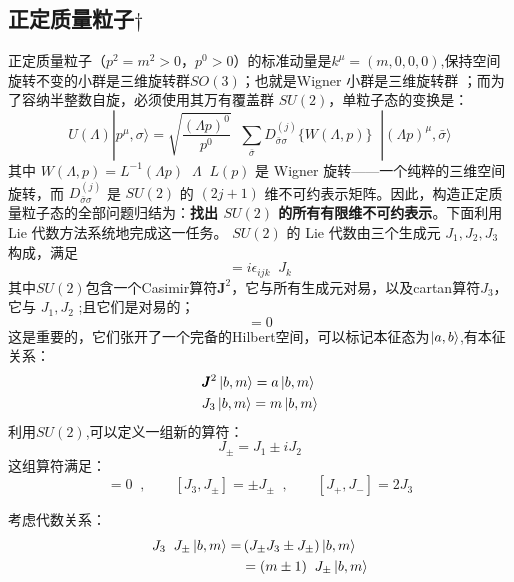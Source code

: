 \subsection{正定质量粒子\(\dagger\)}\label{sec:massive-particle}
正定质量粒子（$p^2 = m^2 > 0$，$p^0 > 0$）的标准动量是$k
^\mu=(m,0,0,0)$,保持空间旋转不变的小群是三维旋转群$SO(3)$；也就是Wigner 小群是三维旋转群 ；而为了容纳半整数自旋，必须使用其万有覆盖群 $SU(2)$，单粒子态的变换是：
\begin{equation}
U(\Lambda)|p^\mu,\sigma\rangle
= \sqrt{\frac{(\Lambda p)^0}{p^0}}\;\;
\sum_{\bar{\sigma}} D^{(j)}_{\bar{\sigma}\sigma}\{W(\Lambda,p)\}\;\;
|(\Lambda p)^\mu,\bar{\sigma}\rangle
\end{equation}
其中 $W(\Lambda,p) = L^{-1}(\Lambda p)\;\;\Lambda\;\;L(p)$ 是 Wigner 旋转——一个纯粹的三维空间旋转，而 $D^{(j)}_{\bar{\sigma}\sigma}$ 是 $SU(2)$ 的 $(2j+1)$ 维不可约表示矩阵。因此，构造正定质量粒子态的全部问题归结为：\textbf{找出 $SU(2)$ 的所有有限维不可约表示}。下面利用 Lie 代数方法系统地完成这一任务。
$SU(2)$ 的 Lie 代数由三个生成元 $J_1, J_2, J_3$ 构成，满足
\begin{equation}
[J_i, J_j] = i\epsilon_{ijk}\;\;J_k
\end{equation}
其中$SU(2)$包含一个Casimir算符$\pmb{J}^2$，它与所有生成元对易，以及cartan算符$J_3$，它与 $J_1, J_2$ ;且它们是对易的；
\begin{equation}
    [\pmb{J}^2,J_3]=0
\end{equation}
这是重要的，它们张开了一个完备的Hilbert空间，可以标记本征态为$\ket{a,b}$,有本征关系：
\begin{subequations}
    \begin{align}
        &\pmb{J}^2\ket{b,m}=a\ket{b,m}\\
        &J_3\ket{b,m}=m\ket{b,m}
    \end{align}
\end{subequations}
利用$SU(2)$,可以定义一组新的算符：
\begin{equation}
J_{\pm} = J_1 \pm iJ_2
\end{equation}
这组算符满足：
\begin{equation}
[\pmb{J}^2, J_{\pm}]=0\;\;,\qquad
[J_3, J_{\pm}] = \pm J_{\pm}\;\;,\qquad
[J_+, J_-] = 2J_3
\end{equation}
\par
考虑代数关系：
\begin{equation}
    \begin{aligned}
        J_3\;\;J_\pm\ket{b,m}=&\left(J_\pm J_3\pm J_\pm\right)\ket{b,m}\\
        &= (m \pm 1)\;\;J_\pm\ket{b,m}
    \end{aligned}
\end{equation}
